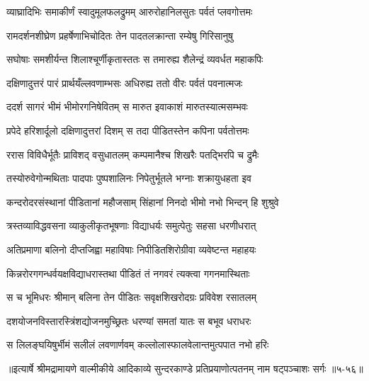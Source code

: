 \twolineshloka
{व्याघ्रादिभिः समाकीर्णं स्वादुमूलफलद्रुमम्}
{आरुरोहानिलसुतः पर्वतं प्लवगोत्तमः} %

\twolineshloka
{रामदर्शनशीघ्रेण प्रहर्षेणाभिचोदितः}
{तेन पादतलक्रान्ता रम्येषु गिरिसानुषु} %

\twolineshloka
{सघोषाः समशीर्यन्त शिलाश्चूर्णीकृतास्ततः}
{स तमारुह्य शैलेन्द्रं व्यवर्धत महाकपिः} %

\twolineshloka
{दक्षिणादुत्तरं पारं प्रार्थयँल्लवणाम्भसः}
{अधिरुह्य ततो वीरः पर्वतं पवनात्मजः} %

\twolineshloka
{ददर्श सागरं भीमं भीमोरगनिषेवितम्}
{स मारुत इवाकाशं मारुतस्यात्मसम्भवः} %

\twolineshloka
{प्रपेदे हरिशार्दूलो दक्षिणादुत्तरां दिशम्}
{स तदा पीडितस्तेन कपिना पर्वतोत्तमः} %

\twolineshloka
{ररास विविधैर्भूतैः प्राविशद् वसुधातलम्}
{कम्पमानैश्च शिखरैः पतद्भिरपि च द्रुमैः} %

\twolineshloka
{तस्योरुवेगोन्मथिताः पादपाः पुष्पशालिनः}
{निपेतुर्भूतले भग्नाः शक्रायुधहता इव} %

\twolineshloka
{कन्दरोदरसंस्थानां पीडितानां महौजसाम्}
{सिंहानां निनदो भीमो नभो भिन्दन् हि शुश्रुवे} %

\twolineshloka
{त्रस्तव्याविद्धवसना व्याकुलीकृतभूषणाः}
{विद्याधर्यः समुत्पेतुः सहसा धरणीधरात्} %

\twolineshloka
{अतिप्रमाणा बलिनो दीप्तजिह्वा महाविषाः}
{निपीडितशिरोग्रीवा व्यवेष्टन्त महाहयः} %

\twolineshloka
{किन्नरोरगगन्धर्वयक्षविद्याधरास्तथा}
{पीडितं तं नगवरं त्यक्त्वा गगनमास्थिताः} %

\twolineshloka
{स च भूमिधरः श्रीमान् बलिना तेन पीडितः}
{सवृक्षशिखरोदग्रः प्रविवेश रसातलम्} %

\twolineshloka
{दशयोजनविस्तारस्त्रिंशद्योजनमुच्छ्रितः}
{धरण्यां समतां यातः स बभूव धराधरः} %

\twolineshloka
{स लिलङ्घयिषुर्भीमं सलीलं लवणार्णवम्}
{कल्लोलास्फालवेलान्तमुत्पपात नभो हरिः} %


॥इत्यार्षे श्रीमद्रामायणे वाल्मीकीये आदिकाव्ये सुन्दरकाण्डे प्रतिप्रयाणोत्पतनम् नाम षट्पञ्चाशः सर्गः ॥५-५६॥
